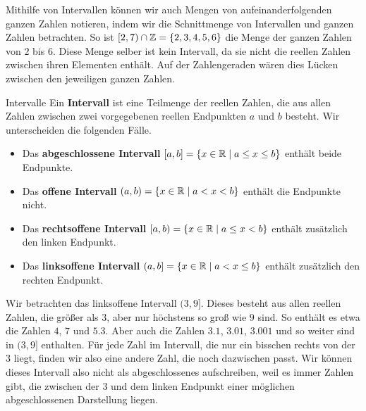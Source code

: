 \documentclass[../../main.tex]{subfiles}
\begin{document}
	\begin{example}{}
		Mithilfe von Intervallen können wir auch Mengen von aufeinanderfolgenden ganzen Zahlen notieren, indem wir die Schnittmenge von Intervallen und ganzen Zahlen betrachten. So ist $[2,7) \cap \mathbb{Z} = \{2,3,4,5,6\}$ die Menge der ganzen Zahlen von $2$ bis $6$. Diese Menge selber ist kein Intervall, da sie nicht die reellen Zahlen zwischen ihren Elementen enthält. Auf der Zahlengeraden wären dies Lücken zwischen den jeweiligen ganzen Zahlen. 
	\end{example}
	\begin{definition}{Intervalle}
		Ein \textbf{Intervall} ist eine Teilmenge der reellen Zahlen, die aus allen Zahlen zwischen zwei vorgegebenen reellen Endpunkten $a$ und $b$ besteht. Wir unterscheiden die folgenden Fälle.
		\begin{itemize}
			\item Das \textbf{abgeschlossene Intervall} $[a,b] = \left\{ x \in \mathbb{R} \mid a \leq x \leq b\right\}$ enthält beide Endpunkte.
			\item Das \textbf{offene Intervall} $(a,b) = \left\{ x \in \mathbb{R} \mid a < x < b\right\}$ enthält die Endpunkte nicht.
			\item Das \textbf{rechtsoffene Intervall} $[a,b) = \left\{ x \in \mathbb{R} \mid a \leq x < b\right\}$ enthält zusätzlich  den linken Endpunkt.
			\item Das \textbf{linksoffene Intervall} $(a,b] = \left\{ x \in \mathbb{R} \mid a < x \leq b\right\}$ enthält zusätzlich den rechten Endpunkt.
		\end{itemize}
	\end{definition}
	
	\begin{example}{}
		Wir betrachten das linksoffene Intervall $(3,9]$. Dieses besteht aus allen reellen Zahlen, die größer als $3$, aber nur höchstens so groß wie $9$ sind. So enthält es etwa die Zahlen $4$, $7$ und $5.3$. Aber auch die Zahlen $3.1$, $3.01$, $3.001$ und so weiter sind in $(3,9]$ enthalten. Für jede Zahl im Intervall, die nur ein bisschen rechts von der $3$ liegt, finden wir also eine andere Zahl, die noch dazwischen passt. Wir können dieses Intervall also nicht als abgeschlossenes aufschreiben, weil es immer Zahlen gibt, die zwischen der $3$ und dem linken Endpunkt einer möglichen abgeschlossenen Darstellung liegen.
	\end{example}
\end{document}
